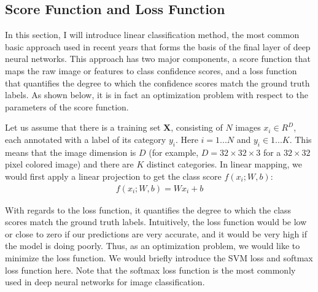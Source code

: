 \subsection{Score Function and Loss Function}
In this section, I will introduce linear classification method, the most common basic approach used in recent years that forms the basis of the final layer of deep neural networks. This approach has two major components, a score function that maps the raw image or features to class confidence scores, and a loss function that quantifies the degree to which the confidence scores match the ground truth labels. As shown below, it is in fact an optimization problem with respect to the parameters of the score function.

Let us assume that there is a training set $\mathbf{X}$, consisting of $N$ images $x_i \in R^D$, each annotated with a label of its category $y_i$. Here $i = 1 ...N$ and $y_i \in 1 ... K$. This means that the image dimension is $D$ (for example, $D=32\times32\times3$ for a $32\times32$ pixel colored image) and there are $K$ distinct categories. In linear mapping, we would first apply a linear projection to get the class score $f(x_i; W, b)$:
\begin{align}
f(x_i; W, b) = Wx_i + b
\end{align}

With regards to the loss function, it quantifies the degree to which the class scores match the ground truth labels. Intuitively, the loss function would be low or close to zero if our predictions are very accurate, and it would be very high if the model is doing poorly. Thus, as an optimization problem, we would like to minimize the loss function. We would briefly introduce the SVM loss and softmax loss function here. Note that the softmax loss function is the most commonly used in deep neural networks for image classification.

